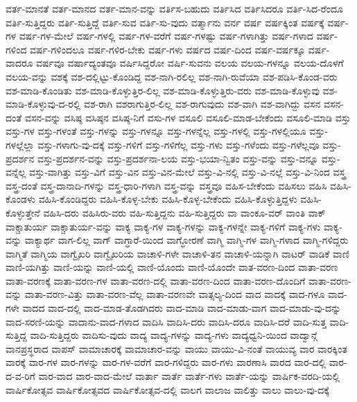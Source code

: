 {ವರ್ತ-ಮಾನತೆ
ವರ್ತ-ಮಾನದ
ವರ್ತ-ಮಾನ-ವನ್ನು
ವರ್ತಿಸ-ಬಹುದು
ವರ್ತಿಸಿದ
ವರ್ತಿಸಿದರೂ
ವರ್ತಿ-ಸಿದ-ರೆಂದೂ
ವರ್ತಿ-ಸುತ್ತಿದ್ದರು
ವರ್ತಿ-ಸುತ್ತಿದ್ದೆ
ವರ್ತಿ-ಸುವ
ವರ್ತಿ-ಸು-ವುದು
ವರ್ತ್ಮಾನು
ವರ್ನ
ವರ್ಷ
ವರ್ಷಕ್ಕಿಂತ
ವರ್ಷಕ್ಕೆ
ವರ್ಷ-ಗಳ
ವರ್ಷ-ಗಳ-ಮೇಲೆ
ವರ್ಷ-ಗಳಲ್ಲಿ
ವರ್ಷ-ಗಳ-ವರೆಗೆ
ವರ್ಷ-ಗಳಷ್ಟು
ವರ್ಷ-ಗಳಾಗಿತ್ತು
ವರ್ಷ-ಗಳಾದ
ವರ್ಷ-ಗಳಿಂದ
ವರ್ಷ-ಗಳಿಂದಲೂ
ವರ್ಷ-ಗಳಿರ-ಬೇಕು
ವರ್ಷ-ಗಳು
ವರ್ಷದ
ವರ್ಷ-ದಿಂದ
ವರ್ಷ-ವರ್ಷಕ್ಕೂ
ವರ್ಷ-ವಾದರೂ
ವರ್ಷವೂ
ವರ್ಷಾದ್ಯಂತವೂ
ವರ್ಷಿಸಿದ್ದರೋ
ವರ್ಷಿ-ಸುವನು
ವಲಯ
ವಲಯ-ಗಳನ್ನೂ
ವಲಯ-ದೊಳಗೆ
ವಲಯ-ವನ್ನು
ವಶಕ್ಕೆ
ವಶ-ದಲ್ಲಿಟ್ಟು-ಕೊಂಡಿದ್ದ
ವಶ-ನಾಗಿ-ರಲಿಲ್ಲ
ವಶ-ನಾಗಿ-ರುವೆಯಾ
ವಶ-ಪಡಿಸಿ-ಕೊಂಡ-ವರು
ವಶ-ಮಾಡಿ-ಕೊಂಡಿತು
ವಶ-ಮಾಡಿ-ಕೊಳ್ಳುತ್ತಿರ-ಲಿಲ್ಲ
ವಶ-ಮಾಡಿ-ಕೊಳ್ಳುತ್ತಿರು-ವರು
ವಶ-ಮಾಡಿ-ಕೊಳ್ಳುವು
ವಶ-ಮಾಡಿ-ಕೊಳ್ಳುವು-ದ-ರಲ್ಲಿ
ವಶ-ರಾಗಿ
ವಶರಾಗುತ್ತಿರ-ಲಿಲ್ಲ
ವಶ-ರಾಗುವುದು
ವಶ-ವಾಗಿ
ವಶ-ವಾಗಿದ್ದು
ವಸನ
ವಸನ-ದಂತೆ
ವಸನ-ವನ್ನು
ವಸಿಷ್ಠ
ವಸಿಷ್ಠನ
ವಸಿಷ್ಠ-ನಿಗೆ
ವಸು-ಗಳ
ವಸೂಲಿ
ವಸೂಲಿ-ಮಾಡ-ಬೇಕೆಂದು
ವಸೂಲಿ-ಮಾಡಿ
ವಸ್ತು
ವಸ್ತು-ಗಳ
ವಸ್ತು-ಗಳಂತೆ
ವಸ್ತು-ಗಳನ್ನು
ವಸ್ತು-ಗಳನ್ನೂ
ವಸ್ತು-ಗಳನ್ನೆಲ್ಲ
ವಸ್ತು-ಗಳಲ್ಲಿ
ವಸ್ತು-ಗಳಲ್ಲಿಯೂ
ವಸ್ತು-ಗಳಲ್ಲೆಲ್ಲಾ
ವಸ್ತು-ಗಳಾಗು-ವು-ದಕ್ಕೆ
ವಸ್ತು-ಗಳಿಗೆ
ವಸ್ತು-ಗಳಿಗೆಲ್ಲ
ವಸ್ತು-ಗಳು
ವಸ್ತು-ಗಳೆಂದು
ವಸ್ತು-ಗಳೆಲ್ಲವೂ
ವಸ್ತು-ಪ್ರದರ್ಶನ
ವಸ್ತು-ಪ್ರದರ್ಶನ-ವನ್ನು
ವಸ್ತು-ಪ್ರದರ್ಶನಾ-ಲಯ
ವಸ್ತು-ಭಯಾ-ನ್ವಿತಂ
ವಸ್ತು-ವನ್ನು
ವಸ್ತು-ವನ್ನೂ
ವಸ್ತು-ವನ್ನೆಲ್ಲ
ವಸ್ತು-ವಾಗಿತ್ತು
ವಸ್ತು-ವಿಗೆ
ವಸ್ತು-ವಿನ
ವಸ್ತು-ವಿನ-ಮೇಲೆ
ವಸ್ತು-ವಿ-ನಲ್ಲಿ
ವಸ್ತು-ವಿ-ನಲ್ಲೆ
ವಸ್ತು-ವಿ-ನಿಂದ
ವಸ್ತ್ರ
ವಸ್ತ್ರ-ದಂತೆ
ವಸ್ತ್ರ-ದಾನಾದಿ-ಗಳನ್ನು
ವಸ್ತ್ರ-ಧಾರಿ-ಗಳಾಗಿ
ವಸ್ತ್ರ-ವನ್ನು
ವಸ್ತ್ರವೂ
ವಹಿಸ-ಬೇಕೆಂದು
ವಹಿಸಲು
ವಹಿಸಿ
ವಹಿಸಿ-ಕೊಂಡಳು
ವಹಿಸಿ-ಕೊಂಡಿದ್ದರು
ವಹಿಸಿ-ಕೊಳ್ಳ-ಬೇಕು
ವಹಿಸಿ-ಕೊಳ್ಳ-ಬೇಕೆಂದು
ವಹಿಸಿ-ಕೊಳ್ಳುತ್ತಿದ್ದಳು
ವಹಿಸಿ-ಕೊಳ್ಳುತ್ತೇನೆ
ವಹಿಸಿ-ದರು
ವಹಿಸಿರು-ವರು
ವಹಿ-ಸುತ್ತಿದ್ದನು
ವಹಿ-ಸುತ್ತಿದ್ದರು
ವಾ
ವಾಂಕೂ-ವರ್
ವಾಂತಿ
ವಾಕ್
ವಾಕ್ಚಾತುರ್ಯ
ವಾಕ್ಚಾತುರ್ಯ-ವನ್ನು
ವಾಕ್ಯ
ವಾಕ್ಯ-ಗಳ
ವಾಕ್ಯ-ಗಳನ್ನು
ವಾಕ್ಯ-ಗಳನ್ನೇ
ವಾಕ್ಯ-ಗಳಿಗೆ
ವಾಕ್ಯ-ಗಳು
ವಾಕ್ಯ-ವನ್ನು
ವಾಕ್ಯಾರ್ಥ
ವಾಗ-ಲಿಲ್ಲ
ವಾಗ್
ವಾಗ್ಧಾರೆ-ಯಿಂದ
ವಾಗ್ಧೋರಣೆ
ವಾಗ್ಮಿ
ವಾಗ್ಮಿ-ಗಳ
ವಾಗ್ಮಿ-ಗಳಾದ
ವಾಗ್ಮಿ-ಗಳಿದ್ದರು
ವಾಗ್ಮಿತೆ
ವಾಗ್ಮಿಯ
ವಾಗ್ವೈಖರಿ
ವಾಗ್ವೈಖರಿಯ
ವಾಚಾಳಿ-ಗಳೇ
ವಾಚಾಳಿ-ತನ
ವಾಚಾಳಿ-ಯನ್ನಾಗಿ
ವಾಟರ್
ವಾಡಿಕೆ
ವಾಣಿ
ವಾಣಿ-ಯಗಿತ್ತು
ವಾಣಿ-ಯನ್ನು
ವಾಣಿ-ಯಲ್ಲಿ
ವಾಣಿ-ಯೊಂದು
ವಾಣಿ-ಯೊಂದೇ
ವಾತ-ವರಣ-ದಿಂದ
ವಾತಾ-ವರಣ
ವಾತಾ-ವರಣಕ್ಕೆ
ವಾತಾ-ವರಣ-ಗಳ
ವಾತಾ-ವರಣ-ದಲ್ಲಿ
ವಾತಾ-ವರಣ-ದಿಂದ
ವಾತಾ-ವರಣ-ದೊಂದಿಗೆ
ವಾತಾ-ವರಣ-ವನ್ನು
ವಾತಾ-ವರಣ-ವಿತ್ತು
ವಾತಾ-ವರಣ-ವೆಲ್ಲ
ವಾತಾ-ವರಣವೇ
ವಾತ್ಸಲ್ಯ-ದಿಂದ
ವಾದ
ವಾದಕ್ಕೆ
ವಾದ-ಗಳೂ
ವಾದ-ಗಳೇ
ವಾದದ
ವಾದ-ದಲ್ಲಿ
ವಾದ-ಮಾಡ-ತೊಡಗಿದರು
ವಾದ-ಮಾಡಿ
ವಾದ-ಮಾಡು-ವಾಗ
ವಾದ-ಮಾಡು-ವು-ದನ್ನು
ವಾದ-ಸರಣಿ-ಯನ್ನು
ವಾದಾನು-ವಾದ-ಗಳಾದ
ವಾದಿಸಿ
ವಾದಿಸಿ-ದರು
ವಾದಿಸಿ-ದರೂ
ವಾದಿಸಿ-ದರೆ
ವಾದಿ-ಸುತ್ತ
ವಾದಿ-ಸುತ್ತಿದ್ದ
ವಾದಿ-ಸುತ್ತಿದ್ದರು
ವಾದಿಸು-ವುದು
ವಾದ್ಯ
ವಾದ್ಯ-ಗಳನ್ನು
ವಾದ್ಯ-ಗಳು
ವಾದ್ಯಧ್ವನಿ-ಯಿಂದ
ವಾದ್ವಾನ್ಗೆ
ವಾನಪ್ರಸ್ಥರಾದ
ವಾಪಸ್
ವಾಮಾಚಾರಕ್ಕೆ
ವಾಮಾಚಾರ-ವನ್ನು
ವಾಯು
ವಾಯು-ವಿ-ನಂತೆ
ವಾಯುವ್ಯ
ವಾರ
ವಾರಕ್ಕಿಂತ
ವಾರಕ್ಕೆ
ವಾರ-ಗಳ
ವಾರ-ಗಳನ್ನು
ವಾರ-ಗಳ-ವರೆಗೆ
ವಾರ-ಗಳಿದ್ದರು
ವಾರ-ಗಳು
ವಾರಣಾಸಿ
ವಾರದ
ವಾರ-ದಲ್ಲಿ
ವಾರ-ದ-ವ-ರಿಗೆ
ವಾರ-ವಾದ
ವಾರ-ವಾದ-ಮೇಲೆ
ವಾರ್ತಾ
ವಾರ್ತೆ
ವಾರ್ತೆ-ಗಳು
ವಾರ್ತೆ-ಯನ್ನು
ವಾರ್ಷಿಕ-ವರದಿ-ಯಲ್ಲಿ
ವಾರ್ಷಿಕೋತ್ಸವ
ವಾರ್ಷಿಕೋತ್ಸವದ
ವಾರ್ಷಿಕೋತ್ಸವ-ದಲ್ಲಿ
ವಾಲಗ
ವಾಲಾಜ
ವಾಲಿತ್ತು
ವಾಲು
ವಾಲು-ವು-ದಕ್ಕೆ
}

